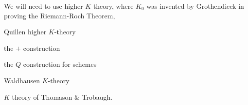 We will need to use higher $K$-theory, where $K_0$ was invented by Grothendieck in proving the Riemann-Roch Theorem,

Quillen higher $K$-theory

the $+$ construction

the $Q$ construction for schemes

Waldhausen $K$-theory

$K$-theory of Thomason \& Trobaugh.
\endinput

Any text after an \endinput is ignored.
You could put scraps here or things in progress.
